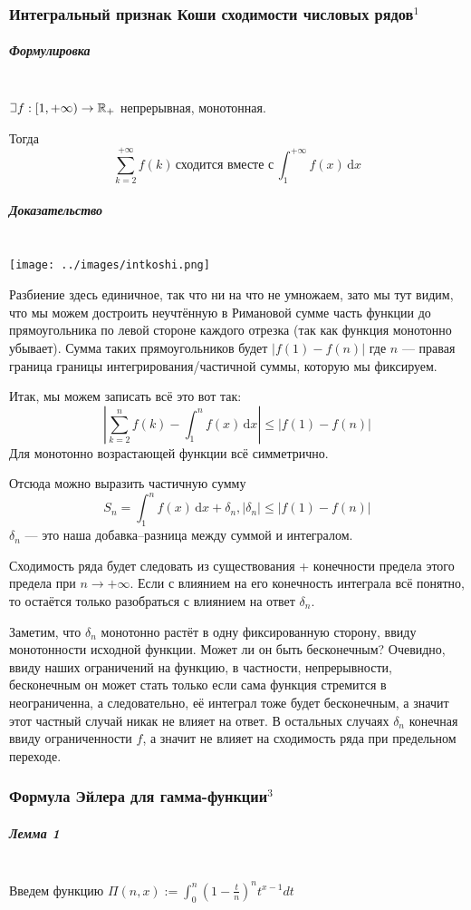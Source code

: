 \documentclass{article}
\def\letus{%
\mathord{\setbox0=\hbox{$\exists$}%
         \hbox{\kern 0.125\wd0%
               \vbox to \ht0{%
                  \hrule width 0.75\wd0%
                  \vfill%
                  \hrule width 0.75\wd0}%
               \vrule height \ht0%
               \kern 0.125\wd0}%
       }%
        }
\def\D{\,\mathrm{d}}
\let\vanillasubparagraph\subparagraph
\renewcommand{\subparagraph}[1]{\vanillasubparagraph{#1}\mbox{}\\}
\begin{document}
\subsubsection{Интегральный признак Коши сходимости числовых рядов\texorpdfstring{$^1$}{}}
\subparagraph{Формулировка}
$\letus f: [1, +\infty) \rightarrow \mathbb{R}_+$ непрерывная, монотонная.

Тогда
$$
\sum_{k=2}^{+\infty} f(k) \,\text{сходится вместе с}\, \int_1^{+\infty}f(x)\D x
$$

\subparagraph{Доказательство}
\texttt{[image: ../images/intkoshi.png]}

Разбиение здесь единичное, так что ни на что не умножаем, зато мы тут видим, что мы можем достроить неучтённую в Римановой сумме часть функции до прямоугольника по левой стороне каждого отрезка (так как функция монотонно убывает). Сумма таких прямоугольников будет $|f(1) - f(n)|$ где $n$ --- правая граница границы интегрирования/частичной суммы, которую мы фиксируем.

Итак, мы можем записать всё это вот так:
$$
\left| \sum_{k=2}^n f(k) - \int_1^n f(x) \D x \right| \le |f(1) - f(n)|
$$
Для монотонно возрастающей функции всё симметрично.

Отсюда можно выразить частичную сумму
$$
S_n = \int_1^n f(x) \D x + \delta_n, |\delta_n| \le |f(1) - f(n)|
$$
$\delta_n$ --- это наша добавка--разница между суммой и интегралом.

Сходимость ряда будет следовать из существования + конечности предела этого предела при $n\rightarrow +\infty$. Если с влиянием на его конечность интеграла всё понятно, то остаётся только разобраться с влиянием на ответ $\delta_n$.

Заметим, что $\delta_n$ монотонно растёт в одну фиксированную сторону, ввиду монотонности исходной функции. Может ли он быть бесконечным? Очевидно, ввиду наших ограничений на функцию, в частности, непрерывности, бесконечным он может стать только если сама функция стремится в неограниченна, а следовательно, её интеграл тоже будет бесконечным, а значит этот частный случай никак не влияет на ответ. В остальных случаях $\delta_n$ конечная ввиду ограниченности $f$, а значит не влияет на сходимость ряда при предельном переходе.

\subsubsection{Формула Эйлера для гамма-функции\texorpdfstring{$^3$}{}}

\subparagraph{Лемма 1}
Введем функцию $\Pi(n, x) := \int_0^n \left(1 - \frac{t}{n}\right)^n t^{x-1} d t$
\end{document}
